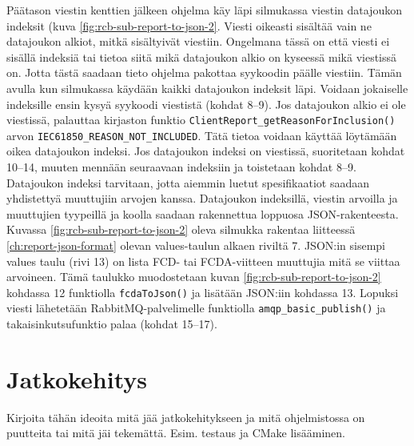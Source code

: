 Päätason viestin kenttien jälkeen ohjelma käy läpi silmukassa viestin datajoukon indeksit (kuva \ref{fig:rcb-sub-report-to-json-2}. Viesti oikeasti sisältää vain ne datajoukon alkiot, mitkä sisältyivät viestiin. Ongelmana tässä on että viesti ei sisällä indeksiä tai tietoa siitä mikä datajoukon alkio on kyseessä mikä viestissä on. Jotta tästä saadaan tieto ohjelma pakottaa syykoodin päälle viestiin. Tämän avulla kun silmukassa käydään kaikki datajoukon indeksit läpi. Voidaan jokaiselle indeksille ensin kysyä syykoodi viestistä (kohdat 8--9). Jos datajoukon alkio ei ole viestissä, palauttaa kirjaston funktio \texttt{ClientReport\_getReasonForInclusion()} arvon \texttt{IEC61850\_REASON\_NOT\_INCLUDED}. Tätä tietoa voidaan käyttää löytämään oikea datajoukon indeksi. Jos datajoukon indeksi on viestissä, suoritetaan kohdat 10--14, muuten mennään seuraavaan indeksiin ja toistetaan kohdat 8--9. Datajoukon indeksi tarvitaan, jotta aiemmin luetut spesifikaatiot saadaan yhdistettyä muuttujiin arvojen kanssa. Datajoukon indeksillä, viestin arvoilla ja muuttujien tyypeillä ja koolla saadaan rakennettua loppuosa JSON-rakenteesta. Kuvassa \ref{fig:rcb-sub-report-to-json-2} oleva silmukka rakentaa liitteessä \ref{ch:report-json-format} olevan values-taulun alkaen riviltä 7. JSON:in sisempi values taulu (rivi 13) on lista FCD- tai FCDA-viitteen muuttujia mitä se viittaa arvoineen. Tämä taulukko muodostetaan kuvan \ref{fig:rcb-sub-report-to-json-2} kohdassa 12 funktiolla \texttt{fcdaToJson()} ja lisätään JSON:iin kohdassa 13. Lopuksi viesti lähetetään RabbitMQ-palvelimelle funktiolla \texttt{amqp\_basic\_publish()} ja takaisinkutsufunktio palaa (kohdat 15--17).

\section{Jatkokehitys}
\begin{it}
	Kirjoita tähän ideoita mitä jää jatkokehitykseen ja mitä ohjelmistossa on puutteita tai mitä jäi tekemättä. Esim. testaus ja CMake lisääminen.
\end{it}
